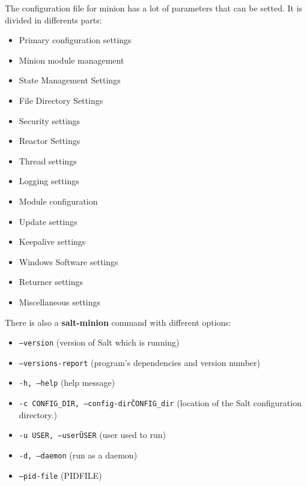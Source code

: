 \documentclass[12pt,a4paper,openright,twoside]{book}
\begin{document}
The configuration file for minion has a lot of parameters that can be setted.
It is divided in differents parts:
\begin{itemize}
    \item Primary configuration settings
    \item Minion module management
    \item State Management Settings
    \item File Directory Settings
    \item Security settings
    \item Reactor Settings
    \item Thread settings
    \item Logging settings
    \item Module configuration
    \item Update settings
    \item Keepalive settings
    \item Windows Software settings
    \item Returner settings
    \item Miscellaneous settings
\end{itemize}

There is also a \textbf{salt-minion} command with different options:

\begin{itemize}
    \item \texttt{--version} (version of Salt which is running)
    \item \texttt{--versions-report} (program's dependencies and version number)
    \item \texttt{-h, --help} (help message)
    \item \texttt{-c CONFIG\_DIR, --config-dir\=CONFIG\_dir} (location of the Salt configuration directory.)
    \item \texttt{-u USER, --user\=USER} (user used to run)
    \item \texttt{-d, --daemon} (run as a daemon)
    \item \texttt{--pid-file} (PIDFILE)
\end{itemize}



%
\end{document}
